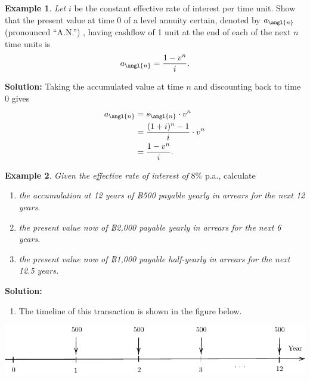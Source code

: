 \documentclass[
]{book}
\providecommand{\tightlist}{%
  \setlength{\itemsep}{0pt}\setlength{\parskip}{0pt}}
\theoremstyle{definition}
\theoremstyle{definition}
\newtheorem{example}{Example}[chapter]
\theoremstyle{definition}
\theoremstyle{definition}
\theoremstyle{remark}
\begin{document}
\begin{example}
\emph{Let} \(i\) be the constant effective rate of interest per time unit. Show
that the present value at time 0 of a level annuity certain, denoted by
\(a_\angl{n}\) (pronounced ``A.N.'') , having cashflow of 1 unit at the end
of each of the next \(n\) time units is
\[a_\angl{n} = \frac{1 - v^n }{i}.\]
\end{example}

\textbf{Solution:} Taking the accumulated value at time \(n\) and discounting
back to time 0 gives \[\begin{aligned}
    a_\angl{n} &= s_\angl{n} \cdot v^n \\
            &= \frac{(1+i)^{n} - 1}{i} \cdot v^n \\
            &=  \frac{1 - v^n }{i}.\end{aligned}\]

\begin{example}

\emph{Given the effective rate of interest of} \(8\%\) p.a., calculate

\begin{enumerate}
\def\labelenumi{\arabic{enumi}.}
\item
  \emph{the accumulation at 12 years of ฿500 payable yearly in arrears for
  the next 12 years.}
\item
  \emph{the present value now of ฿2,000 payable yearly in arrears for the
  next 6 years.}
\item
  \emph{the present value now of ฿1,000 payable half-yearly in arrears for
  the next 12.5 years.}
\end{enumerate}

\end{example}

\textbf{Solution:}

\begin{enumerate}
\def\labelenumi{\arabic{enumi}.}
\tightlist
\item
  The timeline of this transaction is shown in the figure below.
\end{enumerate}

\begin{center}\includegraphics{SCMA266Bookdownproj_files/figure-latex/tikz-ex10-1} \end{center}
\end{document}
